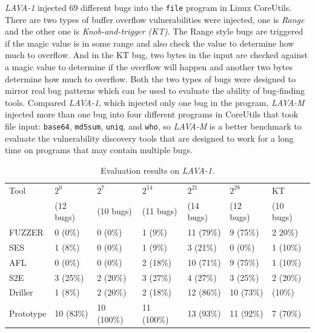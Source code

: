 \textit{LAVA-1} injected 69 different bugs into the \texttt{file} program in Linux CoreUtils. There are two types of buffer overflow vulnerabilities were injected, one is \emph{Range} and the other one is \emph{Knob-and-trigger (KT)}. The Range style bugs are triggered if the magic value is in some range and also check the value to determine how much to overflow. And in the KT bug, two bytes in the input are checked against a magic value to determine if the overflow will happen and another two bytes determine how much to overflow. Both the two types of bugs were designed to mirror real bug patterns which can be used to evaluate the ability of bug-finding tools. Compared \textit{LAVA-1}, which injected only one bug in the program, \textit{LAVA-M} injected more than one bug into four different programs in CoreUtils that took file input: \texttt{base64}, \texttt{md5sum}, \texttt{uniq}, and \texttt{who}, so \textit{LAVA-M} is a better benchmark to evaluate the vulnerability discovery tools that are designed to work for a long time on programs that may contain multiple bugs.

\begin{table}
  \caption{\label{LAVA-1}Evaluation results on \textit{LAVA-1}.}
  \centering
	\begin{tabular}{p{2cm}<{\centering} p{1.5cm}<{\centering} p{1.6cm}<{\centering}  p{1.6cm}<{\centering}	p{1.5cm}<{\centering} p{1.5cm}<{\centering}  p{1.5cm}<{\centering} }
		\toprule
	    Tool & $2^0$ & $2^7$  & $2^{14}$ & $2^{21}$ & $2^{28}$ & KT \\
	         & (12 bugs) & (10 bugs) & (11 bugs) & (14 bugs) & (12 bugs) & (10 bugs) \\
		\midrule
		FUZZER 		& 0 (0\%)   & 0 (0\%)    & 1 (9\%)    & 11 (79\%) & 9 (75\%)  & 2 20\%) \\
		SES	        & 1 (8\%)   & 0 (0\%)    & 1 (9\%)    & 3 (21\%)  & 0 (0\%)   & 1 (10\%) \\
		AFL		    & 0 (0\%)   & 0 (0\%)    & 2 (18\%)   & 10 (71\%) & 9 (75\%)  & 1 (10\%) \\
		S2E			& 3 (25\%)  & 2 (20\%)   & 3 (27\%)   & 4 (27\%)  & 3 (25\%)  & 2 (20\%) \\
		Driller		& 1 (8\%)   & 2 (20\%)   & 2 (18\%)   & 12 (86\%) & 10 (73\%) &  (10\%) \\
		Prototype	& 10 (83\%) & 10 (100\%) & 11 (100\%) & 13 (93\%) & 11 (92\%) & 7 (70\%) \\
	 \bottomrule
	\end{tabular}
\end{table}

